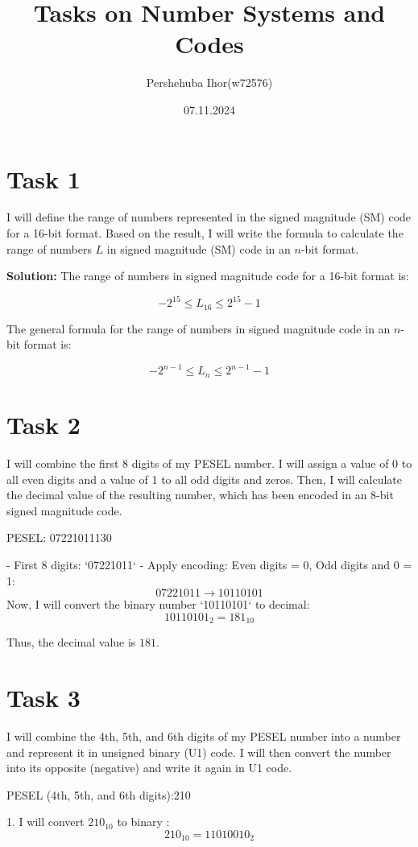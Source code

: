 \documentclass{article}
\title{Tasks on Number Systems and Codes}
\author{Pershehuba Ihor(w72576)}
\date{07.11.2024}
\begin{document}
\maketitle

\section*{Task 1}
I will define the range of numbers represented in the signed magnitude (SM) code for a 16-bit format. Based on the result, I will write the formula to calculate the range of numbers \( L \) in signed magnitude (SM) code in an \( n \)-bit format.

\textbf{Solution:}  
The range of numbers in signed magnitude code for a 16-bit format is:

\[
-2^{15} \leq L_{16} \leq 2^{15} - 1
\]

The general formula for the range of numbers in signed magnitude code in an \( n \)-bit format is:

\[
-2^{n-1} \leq L_n \leq 2^{n-1} - 1
\]

\section*{Task 2}
I will combine the first 8 digits of my PESEL number. I will assign a value of 0 to all even digits and a value of 1 to all odd digits and zeros. Then, I will calculate the decimal value of the resulting number, which has been encoded in an 8-bit signed magnitude code.

PESEL: 07221011130

- First 8 digits: `07221011`
- Apply encoding: Even digits = 0, Odd digits and 0 = 1:
\[
07221011 \rightarrow 10110101
\]
Now, I will convert the binary number `10110101` to decimal:
\[
10110101_2 = 181_{10}
\]

Thus, the decimal value is \( 181 \).

\section*{Task 3}
I will combine the 4th, 5th, and 6th digits of my PESEL number into a number and represent it in unsigned binary (U1) code. I will then convert the number into its opposite (negative) and write it again in U1 code.

PESEL (4th, 5th, and 6th digits):210

1. I will convert \( 210_{10} \) to binary :
   \[
   210_{10} = 11010010_2
   \]
\end{document}
